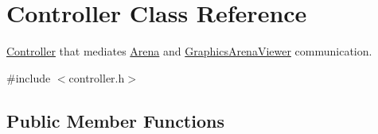 \hypertarget{class_controller}{}\section{Controller Class Reference}
\label{class_controller}


\mbox{\hyperlink{class_controller}{Controller}} that mediates \mbox{\hyperlink{class_arena}{Arena}} and \mbox{\hyperlink{class_graphics_arena_viewer}{Graphics\+Arena\+Viewer}} communication.  




{\ttfamily \#include $<$controller.\+h$>$}

\subsection*{Public Member Functions}
